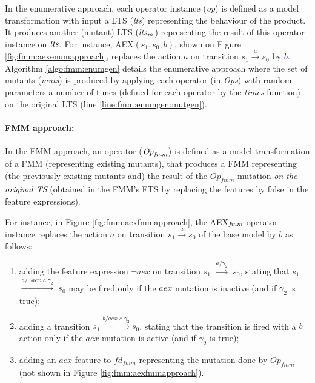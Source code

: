 In the enumerative approach, each operator instance (\textit{op}) is defined as a model transformation with input a LTS (\textit{lts}) representing the behaviour of the product. It produces another (mutant) LTS ($\mathit{lts}_m$) representing the result of this operator instance on $\mathit{lts}$. For instance, AEX$(s_1, s_0, b)$, shown on Figure \ref{fig:fmm:aexenumapproach}, replaces  the action $a$ on transition $s_1 \overset{a}{\longrightarrow} s_0$ by \textcolor{blue}{$b$}. Algorithm \ref{algo:fmm:enumgen} details the enumerative approach where the set of mutants (\textit{muts}) is produced by applying each operator (in \textit{Ops}) with random parameters a number of times (defined for each operator by the \textit{times} function) on the original LTS (line \ref{line:fmm:enumgen:mutgen}).


\paragraph{FMM approach:}

In the FMM approach, an operator ($\mathit{Op}_{\mathit{fmm}}$) is defined as a model transformation of a FMM (representing existing mutants), that produces a FMM representing (the previously existing mutants and) the result of the $\mathit{Op_{fmm}}$ mutation \emph{on the original TS} (obtained in the FMM's FTS by replacing the features by false in the feature expressions). 

For instance, in Figure \ref{fig:fmm:aexfmmapproach}, the AEX$_{\mathit{fmm}}$ operator instance replaces the action $a$ on transition $s_1 \overset{a}{\longrightarrow} s_0$ of the base model by \textcolor{blue}{$b$} as follows: 
\begin{enumerate}
\item adding the feature expression $\neg \mathit{aex}$ on transition $s_1$ $\xrightarrow{a/\gamma_2}$ $s_0$, stating that $s_1$ $\xrightarrow{a/\neg \mathit{aex} \wedge \gamma_2}$ $s_0$ may be fired only if the $\mathit{aex}$ mutation is inactive (and if $\gamma_2$ is true);
\item adding a transition $s_1 \xrightarrow{b/ \mathit{aex} \wedge \gamma_2} s_0$, stating that the transition is fired with a $b$ action only if the $\mathit{aex}$ mutation is active (and if $\gamma_2$ is true);
\item adding an $\mathit{aex}$ feature to $fd_{fmm}$ representing the mutation done by $Op_{fmm}$ (not shown in Figure \ref{fig:fmm:aexfmmapproach}).
\end{enumerate}

